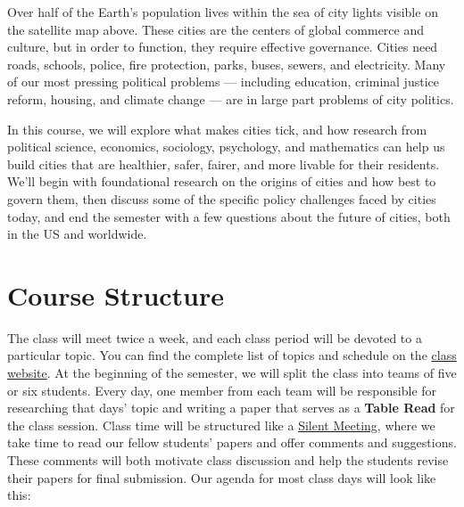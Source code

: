 \documentclass[11pt, letterpaper]{article}
\begin{document}
\noindent Over half of the Earth's population lives within the sea of city lights visible on the satellite map above. These cities are the centers of global commerce and culture, but in order to function, they require effective governance. Cities need roads, schools, police, fire protection, parks, buses, sewers, and electricity. Many of our most pressing political problems --- including education, criminal justice reform, housing, and climate change --- are in large part problems of city politics.

In this course, we will explore what makes cities tick, and how research from political science, economics, sociology, psychology, and mathematics can help us build cities that are healthier, safer, fairer, and more livable for their residents. We'll begin with foundational research on the origins of cities and how best to govern them, then discuss some of the specific policy challenges faced by cities today, and end the semester with a few questions about the future of cities, both in the US and worldwide.



\section*{Course Structure}

The class will meet twice a week, and each class period will be devoted to a particular topic. You can find the complete list of topics and schedule on the \href{https://joeornstein.github.io/pols-4641/}{class website}. At the beginning of the semester, we will split the class into teams of five or six students. Every day, one member from each team will be responsible for researching that days' topic and writing a paper that serves as a \textbf{Table Read} for the class session. Class time will be structured like a  \href{https://medium.com/swlh/the-silent-meeting-manifesto-v1-189e9e3487eb}{Silent Meeting}, where we take time to read our fellow students' papers and offer comments and suggestions. These comments will both motivate class discussion and help the students revise their papers for final submission. Our agenda for most class days will look like this:
\end{document}
